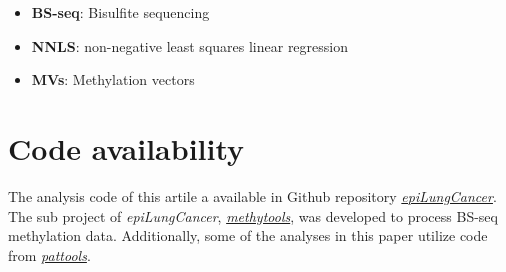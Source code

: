\documentclass[12pt,letterpaper]{article}
\begin{document}
\begin{itemize}
    \item  \textbf{BS-seq}: Bisulfite sequencing
    \item  \textbf{NNLS}: non-negative least squares linear regression
    \item  \textbf{MVs}: Methylation vectors
\end{itemize}

\section{Code availability}\label{sec:code}

The analysis code of this artile a available in Github repository
\href{https://github.com/hcyvan/epiLungCancer}{\textit{epiLungCancer}}. The sub project of \textit{epiLungCancer},
\href{https://github.com/hcyvan/epiLungCancer/tree/main/methytools}{\textit{methytools}},  was developed
to process BS-seq methylation data. Additionally, some of the analyses in this paper utilize code
from \href{https://github.com/hcyvan/pattools}{\textit{pattools}}.




\end{document}
